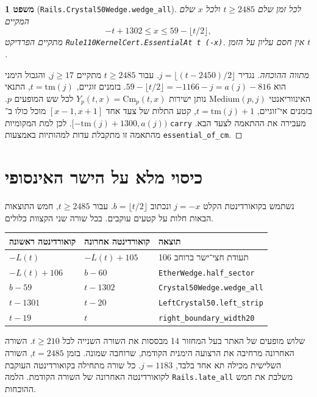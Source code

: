 \documentclass[11pt,a4paper]{article}
\DeclareRobustCommand{\textenglish}[1]{\foreignlanguage{english}{#1}}
\newtheorem{theorem}{משפט}[section]
\begin{document}
\begin{theorem}[\textenglish{\texttt{Rails.Crystal50Wedge.wedge\_all}}]\label{thm:wedge_all}
לכל זמן שלם $t \ge 2485$ ולכל $x$ שלם המקיים
\begin{equation}\label{eq:wedge_region}
-t + 1302 \le x \le 59 - \lfloor t/2 \rfloor,
\end{equation}
מתקיים הפרדיקט \textenglish{\texttt{Rule110KernelCert.EssentialAt t (-x)}}. אין חסם עליון על הזמן $t$.
\end{theorem}

\begin{proof}[מתווה ההוכחה]
נגדיר $j = \lfloor (t - 2450) / 2 \rfloor$. עבור $t \ge 2485$ מתקיים $j \ge 17$, והגבול הימני הוא $59 - \lfloor t/2 \rfloor = -1166 - j = a(j) - 816$. בזמנים זוגיים, $t = \mathrm{tm}(j)$, התנאי האינווריאנטי $\mathrm{Medium}(p, j)$ נותן ישירות $Y_p(t, x) = \mathrm{Cm}_p(t, x)$ לכל שש המופעים $p$. בזמנים אי־זוגיים, $t = \mathrm{tm}(j) + 1$, קטע התלות של צעד אחד $[x - 1, x + 1]$ מוכל כולו ב־$[-\mathrm{tm}(j) + 1300, a(j))$. לכן למת המקומיות \textenglish{\texttt{carry}} מעבירה את ההתאמה לצעד הבא. מהתאמה זו מתקבלת עדות למהותיות באמצעות \textenglish{\texttt{essential\_of\_cm}}.
\end{proof}

\section{כיסוי מלא על הישר האינסופי}
נשתמש בקואורדינטת הקלט $j=-x$ ונכתוב $b=\lfloor t/2\rfloor$. עבור $t\ge2485$, חמש התוצאות הבאות חלות על קטעים עוקבים. בכל שורה שני הקצוות כלולים.
\begin{center}
\begin{tabular}{lll}
\toprule
קואורדינטה ראשונה & קואורדינטה אחרונה & תוצאה \\
\midrule
$-L(t)$ & $-L(t)+105$ & תעודת חצי־ישר ברוחב 106 \\
$-L(t)+106$ & $b-60$ & \textenglish{\texttt{EtherWedge.half\_sector}} \\
$b-59$ & $t-1302$ & \textenglish{\texttt{Crystal50Wedge.wedge\_all}} \\
$t-1301$ & $t-20$ & \textenglish{\texttt{LeftCrystal50.left\_strip}} \\
$t-19$ & $t$ & \textenglish{\texttt{right\_boundary\_width20}} \\
\bottomrule
\end{tabular}
\end{center}
שלוש מופעים של האתר בעל המחזור 14 מבססות את השורה השנייה לכל $t\ge210$. השורה האחרונה מרחיבה את הרצועה הימנית הקודמת, שרוחבה שמונה. בזמן $t=2485$, השורה השלישית מכילה תא אחד בלבד, $j=1183$. כל שורה מתחילה בקואורדינטה העוקבת לקואורדינטה האחרונה של השורה הקודמת. הלמה \textenglish{\texttt{Rails.late\_all}} משלבת את חמש ההוכחות.
\end{document}
